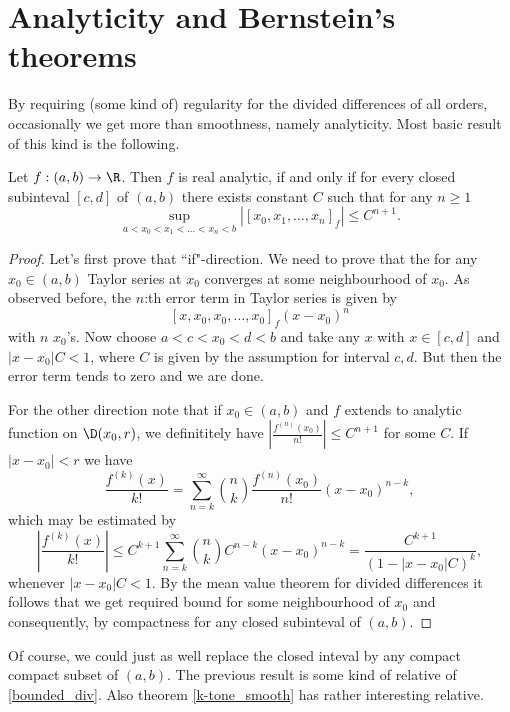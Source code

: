 \section{Analyticity and Bernstein's theorems}

By requiring (some kind of) regularity for the divided differences of all orders, occasionally we get more than smoothness, namely analyticity. Most basic result of this kind is the following.

\begin{lause}\label{div_anal}
	Let $f : (a, b) \to \R$. Then $f$ is real analytic, if and only if for every closed subinteval $[c, d]$ of $(a, b)$ there exists constant $C$ such that for any $n \geq 1$
	\[
		\sup_{a < x_{0} < x_{1} < \ldots < x_{n}< b} |[x_{0}, x_{1}, \ldots, x_{n}]_{f}| \leq C^{n + 1}.
	\]
\end{lause}
\begin{proof}
	Let's first prove that ``if"-direction. We need to prove that the for any $x_{0} \in (a, b)$ Taylor series at $x_{0}$ converges at some neighbourhood of $x_{0}$. As observed before, the $n$:th error term in Taylor series is given by
	\[
		[x, x_{0}, x_{0}, \ldots, x_{0}]_{f} (x - x_{0})^{n}
	\]
	with $n$ $x_{0}$'s. Now choose $a < c < x_{0} < d < b$ and take any $x$ with $x \in [c, d]$ and $|x - x_{0}| C < 1$, where $C$ is given by the assumption for interval $c, d$. But then the error term tends to zero and we are done.

	For the other direction note that if $x_{0} \in (a, b)$ and $f$ extends to analytic function on $\D(x_{0}, r)$, we definititely have $\left|\frac{f^{(n)}(x_{0})}{n!}\right| \leq C^{n + 1}$ for some $C$. If $|x - x_{0}| < r$ we have
	\[
		\frac{f^{(k)}(x)}{k!} = \sum_{n = k}^{\infty} \binom{n}{k} \frac{f^{(n)}(x_{0})}{n!} (x - x_{0})^{n - k},
	\]
	which may be estimated by
	\[
	 \left|\frac{f^{(k)}(x)}{k!}\right| \leq C^{k + 1}\sum_{n = k}^{\infty} \binom{n}{k} C^{n - k} (x - x_{0})^{n - k} = \frac{C^{k + 1} }{(1 - |x - x_{0}| C)^{k}},
	\]
	whenever $|x - x_{0}| C < 1$. By the mean value theorem for divided differences it follows that we get required bound for some neighbourhood of $x_{0}$ and consequently, by compactness for any closed subinteval of $(a, b)$.
\end{proof}

Of course, we could just as well replace the closed inteval by any compact compact subset of $(a, b)$. The previous result is some kind of relative of \ref{bounded_div}. Also theorem \ref{k-tone_smooth} has rather interesting relative.

